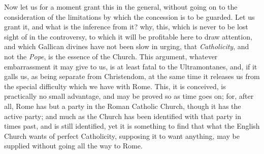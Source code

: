 Now let us for a moment grant this in the
general, without going on to the consideration of the limitations by which the concession is to be guarded. Let us grant it, and what is
the inference from it? why, this, which is never to be lost sight of
in the controversy, to which it will be profitable here to draw
attention, and which Gallican divines have not been slow in urging,
that \emph{Catholicity}, and not the \emph{Pope}, is the essence of
the Church. This argument, whatever embarrassment it may give to us,
is at least fatal to the Ultramontanes, and, if it galls us, as being
separate from Christendom, at the same time it releases us from the
special difficulty which we have with Rome. This, it is conceived, is
practically no small advantage, and may be proved so as time goes on;
for, after all, Rome has but a party in the Roman Catholic Church,
though it has the active party; and much as the Church has been
identified with that party in times past, and is still identified, yet
it is something to find that what the English Church wants of perfect
Catholicity, supposing it to want anything, may be supplied without
going all the way to Rome.


